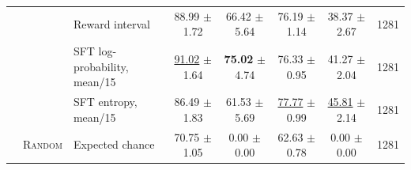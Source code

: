 \begin{table}[t]
\begin{tabular}{lllccccc}
 &  & Reward interval & 88.99 $\pm$ 1.72 & 66.42 $\pm$ 5.64 & 76.19 $\pm$ 1.14 & 38.37 $\pm$ 2.67 & 1281 \\
 &  & SFT log-probability, mean/15 & \underline{91.02} $\pm$ 1.64 & \textbf{75.02} $\pm$ 4.74 & 76.33 $\pm$ 0.95 & 41.27 $\pm$ 2.04 & 1281 \\
 &  & SFT entropy, mean/15 & 86.49 $\pm$ 1.83 & 61.53 $\pm$ 5.69 & \underline{77.77} $\pm$ 0.99 & \underline{45.81} $\pm$ 2.14 & 1281 \\
 & \textsc{Random} & Expected chance & 70.75 $\pm$ 1.05 & 0.00 $\pm$ 0.00 & 62.63 $\pm$ 0.78 & 0.00 $\pm$ 0.00 & 1281 \\
\bottomrule
\end{tabular}
\end{table}

